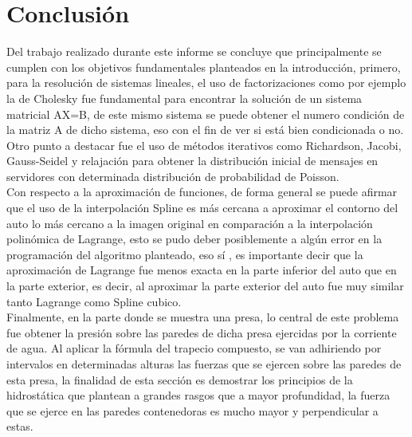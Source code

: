 \documentclass{udpreport}
\begin{document}
 \newpage

    
    
\chapter{Conclusión}
Del trabajo realizado durante este informe se concluye que principalmente se cumplen con los objetivos fundamentales planteados en la introducción,  primero, para la resolución de sistemas lineales, el uso de factorizaciones como por ejemplo la de Cholesky fue fundamental para encontrar la solución de un sistema matricial AX=B, de este mismo sistema se puede obtener el numero condición de la matriz A de dicho sistema, eso con el fin de ver si está bien condicionada o no.
\\
Otro punto a destacar fue el uso de métodos iterativos como Richardson, Jacobi, Gauss-Seidel y relajación para obtener la distribución inicial de mensajes en servidores con determinada distribución de probabilidad de Poisson.
\\
Con respecto a la aproximación de funciones, de forma general se puede afirmar que el uso de la interpolación Spline es más cercana a aproximar el contorno del auto lo más cercano a la imagen original en comparación a la interpolación polinómica de Lagrange, esto se pudo deber posiblemente a algún error en la programación del algoritmo planteado, eso sí , es importante decir que la aproximación de Lagrange fue menos exacta en la parte inferior del auto que en la parte exterior, es decir, al aproximar la parte exterior del auto fue muy similar tanto Lagrange como Spline cubico. 
\\
Finalmente, en la parte donde se muestra una presa, lo central de este problema fue obtener la presión sobre las paredes de dicha presa ejercidas por la corriente de agua. Al aplicar la fórmula del trapecio compuesto, se van adhiriendo por intervalos en determinadas alturas las fuerzas que se ejercen sobre las paredes de esta presa, la finalidad de esta sección es demostrar los principios de la hidrostática que plantean a grandes rasgos que a mayor profundidad, la fuerza que se ejerce en las paredes contenedoras es mucho mayor y perpendicular a estas.
\end{document}
